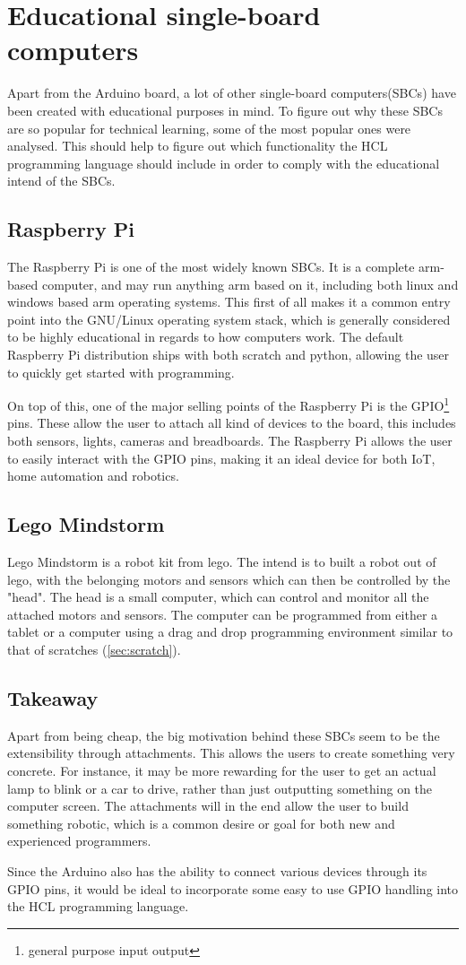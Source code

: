 \section{Educational single-board computers}

Apart from the Arduino board, a lot of other single-board computers(SBCs) have been created with educational purposes in mind.
To figure out why these SBCs are so popular for technical learning, some of the most popular ones were analysed.
This should help to figure out which functionality the HCL programming language should include in order to comply with the educational intend of the SBCs.\cite{SBC}

\subsection{Raspberry Pi}
The Raspberry Pi is one of the most widely known SBCs. 
It is a complete arm-based computer, and may run anything arm based on it, including both linux and windows based arm operating systems. 
This first of all makes it a common entry point into the GNU/Linux operating system stack, which is generally considered to be highly educational in regards to how computers work.
The default Raspberry Pi distribution ships with both scratch and python, allowing the user to quickly get started with programming.\cite{RaspberryPi}

On top of this, one of the major selling points of the Raspberry Pi is the GPIO\footnote{general purpose input output} pins. 
These allow the user to attach all kind of devices to the board, this includes both sensors, lights, cameras and breadboards. 
The Raspberry Pi allows the user to easily interact with the GPIO pins, making it an ideal device for both IoT, home automation and robotics.\cite{RaspberryPi}

\subsection{Lego Mindstorm}
Lego Mindstorm is a robot kit from lego. 
The intend is to built a robot out of lego, with the belonging motors and sensors which can then be controlled by the "head". 
The head is a small computer, which can control and monitor all the attached motors and sensors. 
The computer can be programmed from either a tablet or a computer using a drag and drop programming environment similar to that of scratches (\ref{sec:scratch}). \cite{LegoMindstorms}

\subsection{Takeaway}
Apart from being cheap, the big motivation behind these SBCs seem to be the extensibility through attachments. 
This allows the users to create something very concrete. 
For instance, it may be more rewarding for the user to get an actual lamp to blink or a car to drive, rather than just outputting something on the computer screen. 
The attachments will in the end allow the user to build something robotic, which is a common desire or goal for both new and experienced programmers.\cite{EducationalRobotics}

Since the Arduino also has the ability to connect various devices through its GPIO pins, it would be ideal to incorporate some easy to use GPIO handling into the HCL programming language.
